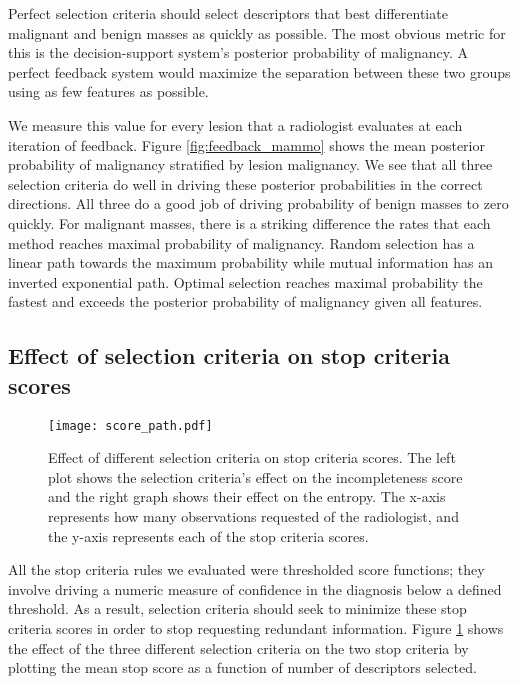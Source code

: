 Perfect selection criteria should select descriptors that best differentiate malignant and benign masses as quickly as possible.
The most obvious metric for this is the decision-support system's posterior probability of malignancy.
A perfect feedback system would maximize the separation between these two groups using as few features as possible.

We measure this value for every lesion that a radiologist evaluates at each iteration of feedback.
Figure \ref{fig:feedback_mammo} shows the mean posterior probability of malignancy stratified by lesion malignancy.
We see that all three selection criteria do well in driving these posterior probabilities in the correct directions.
All three do a good job of driving probability of benign masses to zero quickly.
For malignant masses, there is a striking difference the rates that each method reaches maximal probability of malignancy.
Random selection has a linear path towards the maximum probability while mutual information has an inverted exponential path.
Optimal selection reaches maximal probability the fastest and exceeds the posterior probability of malignancy given all features.

\subsection{Effect of selection criteria on stop criteria scores}

\begin{figure}[h]
	\centering
	\texttt{[image: score\_path.pdf]}
	\caption[Effect of selection criteria on stop criteria scores]{Effect of different selection criteria on stop criteria scores. The left plot shows the selection criteria's effect on the incompleteness score and the right graph shows their effect on the entropy. The x-axis represents how many observations requested of the radiologist, and the y-axis represents each of the stop criteria scores.}
	\label{fig:feedback_score_path}
\end{figure} 

All the stop criteria rules we evaluated were thresholded score functions; they involve driving a numeric measure of confidence in the diagnosis below a defined threshold.
As a result, selection criteria should seek to minimize these stop criteria scores in order to stop requesting redundant information.
Figure \ref{fig:feedback_score_path} shows the effect of the three different selection criteria on the two stop criteria by plotting the mean stop score as a function of number of descriptors selected.

